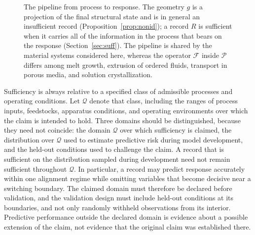 \documentclass[11pt]{article}
\theoremstyle{definition}
\begin{document}
\begin{figure}[t]
\centering
{}
\caption{The pipeline from process to response. The geometry $g$ is a projection of the final structural state and is in general an insufficient record (Proposition~\ref{prop:nonid}); a record $R$ is sufficient when it carries all of the information in the process that bears on the response (Section~\ref{sec:suff}). The pipeline is shared by the material systems considered here, whereas the operator $\mathcal{F}$ inside $\mathcal{P}$ differs among melt growth, extrusion of ordered fluids, transport in porous media, and solution crystallization.}
\label{fig:pipeline}
\end{figure}

Sufficiency is always relative to a specified class of admissible processes and operating conditions. Let $\mathcal{Q}$ denote that class, including the ranges of process inputs, feedstocks, apparatus conditions, and operating environments over which the claim is intended to hold. Three domains should be distinguished, because they need not coincide: the domain $\mathcal{Q}$ over which sufficiency is claimed, the distribution over $\mathcal{Q}$ used to estimate predictive risk during model development, and the held-out conditions used to challenge the claim. A record that is sufficient on the distribution sampled during development need not remain sufficient throughout $\mathcal{Q}$. In particular, a record may predict response accurately within one alignment regime while omitting variables that become decisive near a switching boundary. The claimed domain must therefore be declared before validation, and the validation design must include held-out conditions at its boundaries, and not only randomly withheld observations from its interior. Predictive performance outside the declared domain is evidence about a possible extension of the claim, not evidence that the original claim was established there.
\end{document}

